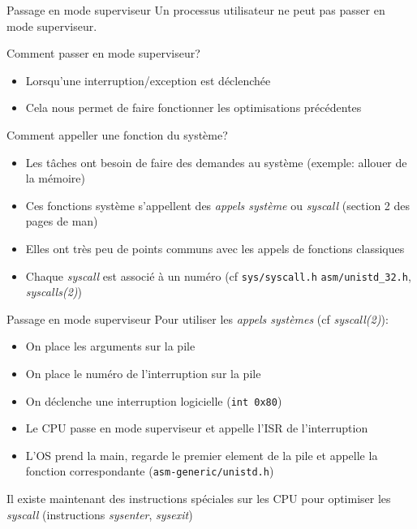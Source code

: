 \begin{frame}{Passage en mode superviseur}
  Un processus utilisateur ne peut pas passer en mode superviseur.

  Comment passer en mode superviseur?
  \begin{itemize} 
  \item Lorsqu'une interruption/exception est déclenchée
  \item Cela nous permet de faire fonctionner les optimisations précédentes
  \end{itemize} 

  Comment appeller une fonction du système?
  \begin{itemize} 
  \item  Les  tâches ont  besoin  de  faire  des demandes  au  système
    (exemple: allouer de la mémoire)
  \item Ces fonctions système s'appellent des \emph{appels système} ou
    \emph{syscall} (section 2 des pages de man)
  \item  Elles ont  très  peu de  points  communs avec  les appels  de
    fonctions classiques
  \item   Chaque  \emph{syscall}   est   associé  à   un  numéro   (cf
    \texttt{sys/syscall.h}                   \texttt{asm/unistd\_32.h},
    \emph{syscalls(2)})
  \end{itemize}

\end{frame}

\begin{frame}{Passage en mode superviseur}
  Pour utiliser les \emph{appels systèmes} (cf \emph{syscall(2)}):
  \begin{itemize}
  \item On place les arguments sur la pile
  \item On place le numéro de l'interruption sur la pile
  \item On déclenche une interruption logicielle (\texttt{int 0x80})
  \item  Le  CPU  passe  en  mode  superviseur  et  appelle  l'ISR  de
    l'interruption
  \item L'OS prend  la main, regarde le premier element  de la pile et
    appelle la fonction correspondante (\texttt{asm-generic/unistd.h})
  \end{itemize}
  Il  existe maintenant  des instructions  spéciales sur  les  CPU pour
  optimiser   les    \emph{syscall}   (instructions   \emph{sysenter},
  \emph{sysexit})
\end{frame}

